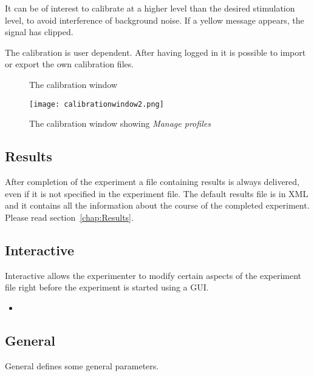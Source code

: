 It can be of interest to calibrate at a higher level than the
desired stimulation level, to avoid interference of background
noise. If a yellow message appears, the signal has clipped.


The calibration is user dependent. After having logged in it is
possible to import or export the own calibration files.


\begin{figure}
 \centering
 \caption{The calibration window}
 \label{fig:name1}
\end{figure}


\begin{figure}
 \centering
\texttt{[image: calibrationwindow2.png]}
 \caption{The calibration window showing \emph{Manage profiles}}
 \label{fig:name2}
\end{figure}
\label{sec:Calibration}




\subsection{Results}
\label{sec:Results}



After completion of the experiment a file containing results is
always delivered, even if it is not specified in the experiment
file. The default results file is in XML and it contains all the
information about the course of the completed experiment. Please
read section~\ref{chap:Results}.

\subsection{Interactive}

\label{sec:Interactive}

Interactive allows the experimenter to modify certain aspects of
the experiment file right before the experiment is started using a
GUI.


\begin{itemize}
\item {}
\end{itemize}

\subsection{General}
General defines some general parameters.

